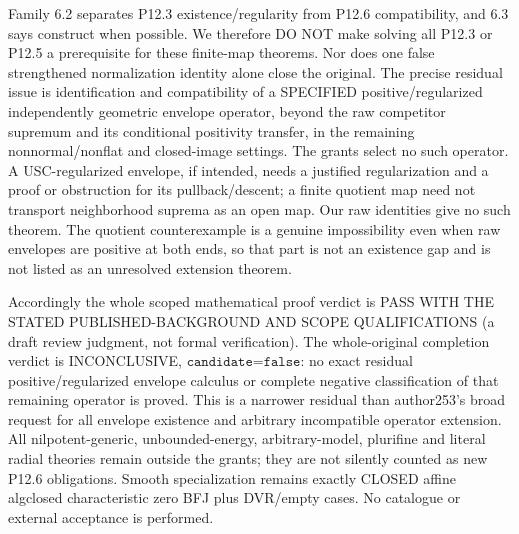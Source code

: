 Family 6.2 separates P12.3 existence/regularity from P12.6 compatibility, and 6.3 says construct when possible. We therefore DO NOT make solving all P12.3 or P12.5 a prerequisite for these finite-map theorems. Nor does one false strengthened normalization identity alone close the original. The precise residual issue is identification and compatibility of a SPECIFIED positive/regularized independently geometric envelope operator, beyond the raw competitor supremum and its conditional positivity transfer, in the remaining nonnormal/nonflat and closed-image settings. The grants select no such operator. A USC-regularized envelope, if intended, needs a justified regularization and a proof or obstruction for its pullback/descent; a finite quotient map need not transport neighborhood suprema as an open map. Our raw identities give no such theorem. The quotient counterexample is a genuine impossibility even when raw envelopes are positive at both ends, so that part is not an existence gap and is not listed as an unresolved extension theorem.

Accordingly the whole scoped mathematical proof verdict is PASS WITH THE STATED PUBLISHED-BACKGROUND AND SCOPE QUALIFICATIONS (a draft review judgment, not formal verification). The whole-original completion verdict is INCONCLUSIVE, $\texttt{candidate=false}$: no exact residual positive/regularized envelope calculus or complete negative classification of that remaining operator is proved. This is a narrower residual than author253's broad request for all envelope existence and arbitrary incompatible operator extension. All nilpotent-generic, unbounded-energy, arbitrary-model, plurifine and literal radial theories remain outside the grants; they are not silently counted as new P12.6 obligations. Smooth specialization remains exactly CLOSED affine algclosed characteristic zero BFJ plus DVR/empty cases. No catalogue or external acceptance is performed.
